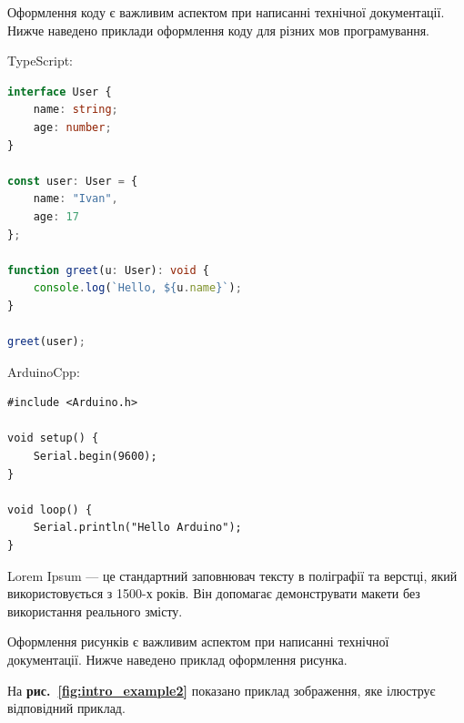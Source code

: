 

Оформлення коду є важливим аспектом при написанні технічної документації. Нижче наведено приклади оформлення коду для різних мов програмування.

TypeScript:
\begin{lstlisting}[style=nocodeframe, language=TypeScript]
interface User {
    name: string;
    age: number;
}

const user: User = {
    name: "Ivan",
    age: 17
};

function greet(u: User): void {
    console.log(`Hello, ${u.name}`);
}

greet(user);
\end{lstlisting}

ArduinoCpp:
\begin{lstlisting}[style=nocodeframe, language=ArduinoCpp]
#include <Arduino.h>

void setup() {
    Serial.begin(9600);
}

void loop() {
    Serial.println("Hello Arduino");
}
\end{lstlisting}

Lorem Ipsum — це стандартний заповнювач тексту в поліграфії та верстці, який використовується з 1500-х років. Він допомагає демонструвати макети без використання реального змісту.


Оформлення рисунків є важливим аспектом при написанні технічної документації. Нижче наведено приклад оформлення рисунка.


На \textbf{рис.~\ref{fig:intro_example2}} показано приклад зображення, яке ілюструє відповідний приклад.



